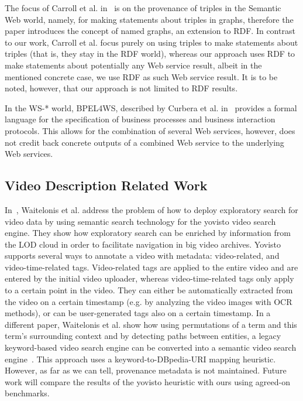 \documentclass[conference]{IEEEtran}
\begin{document}
The focus of Carroll et al. in~\cite{carroll2005} is on the provenance of triples in the Semantic Web world, namely, for making statements about triples in graphs, therefore the paper introduces the concept of named graphs, an extension to RDF. In contrast to our work, Carroll et al. focus purely on using triples to make statements about triples (that is, they stay in the RDF world), whereas our approach uses RDF to make statements about potentially any Web service result, albeit in the mentioned concrete case, we use RDF as such Web service result. It is to be noted, however, that our approach is not limited to RDF results.

In the WS-* world, BPEL4WS, described by Curbera et al. in~\cite{Curbera:2003:NSW:944217.944234} provides a formal language for the specification of business processes and business interaction protocols. This allows for the combination of several Web services, however, does not credit back concrete outputs of a combined Web service to the underlying Web services.

\subsection{Video Description Related Work}

In~\cite{Sack:VideoSearch}, Waitelonis et al. address the problem of how to deploy exploratory search for video data by
using semantic search technology for the yovisto video search engine. They show how exploratory search can be enriched
by information from the LOD cloud in order to facilitate navigation in big video archives. Yovisto supports several
ways to annotate a video with metadata: video-related, and video-time-related tags. Video-related tags are applied to
the entire video and are entered by the initial video uploader, whereas video-time-related tags only apply to a certain
point in the video. They can either be automatically extracted from the video on a certain timestamp (e.g. by analyzing
the video images with OCR methods), or can be user-generated tags also on a certain timestamp. In a different paper,
Waitelonis et al. show how using permutations of a term and this term's surrounding context and by detecting paths
between entities, a legacy keyword-based video search engine can be converted into a semantic video search
engine~\cite{Sack:Use}. This approach uses a keyword-to-DBpedia-URI mapping heuristic. However, as far as we can tell,
provenance metadata is not maintained. Future work will compare the results of the yovisto heuristic with ours using
agreed-on benchmarks.
\end{document}
